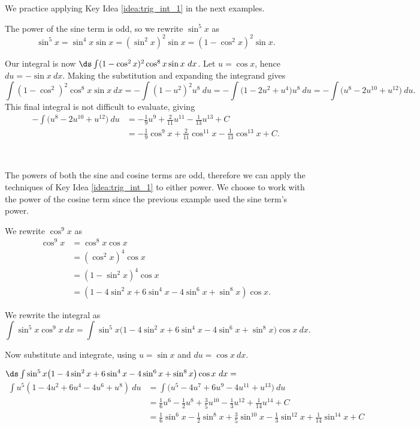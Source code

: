 We practice applying Key Idea \ref{idea:trig_int_1} in the next examples.\\

{The power of the sine term is odd, so we rewrite $\sin^5x$ as $$\sin^5x = \sin^4x\sin x = (\sin^2x)^2\sin x = (1-\cos^2x)^2\sin x.$$

Our integral is now $\ds \int (1-\cos^2x)^2\cos^8x\sin x\ dx$. Let $u = \cos x$, hence $du = -\sin x\ dx$. Making the substitution and expanding the integrand gives
$$\int (1-\cos^2)^2\cos^8x\sin x\ dx = -\int (1-u^2)^2u^8\ du = -\int \big(1-2u^2+u^4\big)u^8\ du = -\int \big(u^8-2u^{10}+u^{12}\big)\ du.$$
This final integral is not difficult to evaluate, giving 
\begin{align*} -\int \big(u^8-2u^{10}+u^{12}\big)\ du &= -\frac19u^9 + \frac2{11}u^{11} - \frac1{13}u^{13} + C \\
										&=-\frac19\cos^9 x + \frac2{11}\cos^{11} x - \frac1{13}\cos^{13} x + C.
\end{align*}
}\\

{The powers of both the sine and cosine terms are odd, therefore we can apply the techniques of Key Idea \ref{idea:trig_int_1} to either power. We choose to work with the power of the cosine term since the previous example used the sine term's power.

We rewrite $\cos^9x$ as
\begin{align*} \cos^9 x &= \cos^8x\cos x \\
				&= (\cos^2x)^4\cos x \\
				&= (1-\sin^2x)^4\cos x \\
				&= (1-4\sin^2x+6\sin^4x-4\sin^6x+\sin^8x)\cos x.
\end{align*}

We rewrite the integral as 
$$\int\sin^5x\cos^9x\ dx = \int\sin^5x\big(1-4\sin^2x+6\sin^4x-4\sin^6x+\sin^8x\big)\cos x\ dx.$$

Now substitute and integrate, using $u = \sin x $ and $du = \cos x\ dx$.

\small\noindent
$\ds \int\sin^5x\big(1-4\sin^2x+6\sin^4x-4\sin^6x+\sin^8x\big)\cos x\ dx =$%
\begin{align*} 
 \int u^5(1-4u^2+6u^4-4u^6+u^8)\ du &= \int\big(u^5-4u^7+6u^9-4u^{11}+u^{13}\big)\ du \\
				&= \frac16u^6-\frac12u^8+\frac35u^{10}-\frac13u^{12}+\frac{1}{14}u^{14}+C\\
				&= \frac16\sin^6 x-\frac12\sin^8 x+\frac35\sin^{10} x-\frac13\sin^{12} x+\frac{1}{14}\sin^{14} x+C
\end{align*}
\normalsize
{}\baselineskip
}\\

